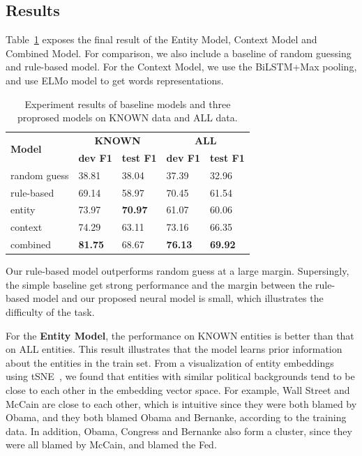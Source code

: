\documentclass[letterpaper]{article} %
\begin{document}
\subsection{Results}

Table~\ref{table:finalresult} exposes the final result of the Entity Model, Context Model and Combined Model. For comparison, we also include a baseline of random guessing and rule-based model. For the Context Model, we use the BiLSTM+Max pooling, and use ELMo model to get words representations.

\begin{table}[t]
\centering
\begin{tabular}{l | p{1cm} p{1cm} | p{1cm} p{1cm}} 
\hline
\multirow{2}{2pt}{\bf Model} & \multicolumn{2}{c}{\bf KNOWN}  & \multicolumn{2}{c}{\bf ALL} \\
 & {\bf dev F1 } & {\bf test F1} & {\bf dev F1 } & {\bf test F1 } \\
\hline\hline
random guess & 38.81 & 38.04 & 37.39 & 32.96 \\
\hline
rule-based & 69.14  & 58.97 & 70.45 & 61.54 \\
\hline\hline
entity & 73.97 & {\bf 70.97} & 61.07 & 60.06 \\ 
\hline
context & 74.29  & 63.11 & 73.16 & 66.35 \\
\hline
combined & {\bf 81.75}  & 68.67 & {\bf 76.13}  & {\bf 69.92} \\
\hline
\end{tabular}
\caption{Experiment results of baseline models and three proprosed models on KNOWN data and ALL data.}
\label{table:finalresult}
\end{table}

Our rule-based model outperforms random guess at a large margin. Supersingly, the simple baseline get strong performance and the margin between the rule-based model and our proposed neural model is small, which illustrates the difficulty of the task.

For the \textbf{Entity Model}, the performance on KNOWN entities is better than that on ALL entities. This result illustrates that the model learns prior information about the entities in the train set. From a visualization of entity embeddings using tSNE~\cite{maaten2008visualizing}, we found that entities with similar political backgrounds tend to be close to each other in the embedding vector space. For example, Wall Street and McCain are close to each other, which is intuitive since they were both blamed by Obama, and they both blamed Obama and Bernanke, according to the training data. In addition, Obama, Congress and Bernanke also form a cluster, since they were all blamed by McCain, and blamed the Fed.
\end{document}
